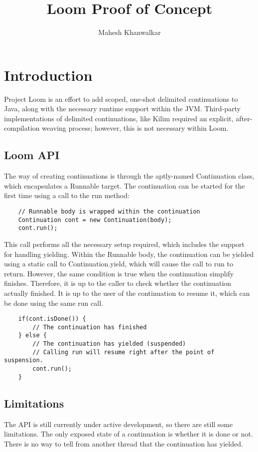 \documentclass[12pt]{article}
\title{Loom Proof of Concept}
\author{Mahesh Khanwalkar}
\date{}
\begin{document}
    \maketitle
    \section{Introduction}

    Project Loom is an effort to add scoped, one-shot delimited continuations to Java, along with the
    necessary runtime support within the JVM. Third-party implementations of delimited continuations, like
    Kilim required an explicit, after-compilation weaving process; however, this is not necessary within
    Loom.

    \subsection{Loom API}

    The way of creating continuations is through the aptly-named Continuation class, which encapsulates a
    Runnable target. The continuation can be started for the first time using a call to the run method:

    \begin{lstlisting}
    // Runnable body is wrapped within the continuation
    Continuation cont = new Continuation(body); 
    cont.run();
    \end{lstlisting}

    This call performs all the necessary setup required, which includes the support for handling yielding.
    Within the Runnable body, the continuation can be yielded using a static call to Continuation.yield,
    which will cause the call to run to return. However, the same condition is true when the continuation
    simplify finishes. Therefore, it is up to the caller to check whether the continuation actually finished.
    It is up to the user of the continuation to resume it, which can be done using the same run call.

    \begin{lstlisting}
    if(cont.isDone()) {
        // The continuation has finished
    } else {
        // The continuation has yielded (suspended)
        // Calling run will resume right after the point of suspension.
        cont.run();
    }
    \end{lstlisting}

    \subsection{Limitations}
    The API is still currently under active development, so there are still some limitations. The only
    exposed state of a continuation is whether it is done or not. There is no way to tell from another thread
    that the continuation has yielded.
\end{document}
